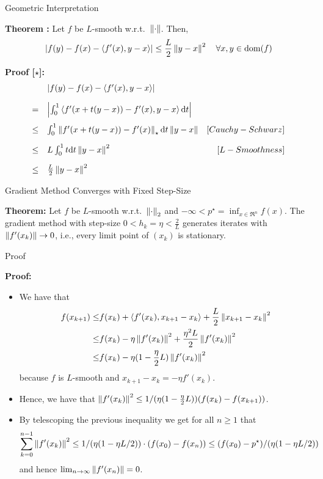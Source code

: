 \documentclass[9pt]{beamer}
\begin{document}
\begin{frame}{Geometric Interpretation}

  \textbf{Theorem :} Let $f$ be $L$-smooth w.r.t.\ $\left\|\cdot\right\|$. Then,
  \[
    \left|f(y)-f(x)-\left<f'(x), y-x\right>\right| \leq \frac{L}{2} \left\|y-x\right\|^2 \quad \forall x, y\in \operatorname{dom}(f)
  \]

  \vfill

  \textbf{Proof [$\star$]: }
  \[
    \begin{array}{rlr}
      & \left|f(y)-f(x)-\left<f'(x), y-x\right>\right| & \\[1em]
      = & \left|\int_{0}^1 \left<f'(x+t(y-x))-f'(x), y-x\right> {\mathrm{d}} t\right| & \\[1em]
      \leq & \int_0^1 \left\|f'(x+t(y-x))-f'(x)\right\|_\star {\mathrm{d}} t \left\|y-x\right\| & [Cauchy-Schwarz]\\[1em]
      \leq & L \int_0^1 t {\mathrm{d}} t \left\|y-x\right\|^2 & [L-Smoothness]\\[1em]
      \leq & \frac{L}{2} \left\|y-x\right\|^2 & 
    \end{array}
  \]
\end{frame}

\begin{frame}{Gradient Method Converges with Fixed Step-Size}

  \textbf{Theorem:} Let $f$ be $L$-smooth w.r.t.\ $\left\|\cdot\right\|_2$ and $-\infty < p^\star = \inf_{x\in\Re^n} f(x)$. The gradient method with step-size $0<h_k = \eta < \frac{2}{L}$ generates iterates with $\left\|f'(x_k)\right\|\to 0$, i.e., every limit point of $(x_k)$ is stationary.

\end{frame}

\begin{frame}{Proof}

  \textbf{Proof:}
  \begin{itemize}
  \item We have that
    \begin{align*}
      f(x_{k+1}) \leq &  f(x_k) + \left<f'(x_k), x_{k+1}-x_k\right> + \frac{L}{2} \left\|x_{k+1}-x_k\right\|^2 \\
      \leq & f(x_k) - \eta \left\|f'(x_k)\right\|^2+\frac{\eta^2 L}{2} \left\|f'(x_k)\right\|^2 \\
      \leq & f(x_k) - \eta (1-\frac{\eta}{2}L)\left\|f'(x_k)\right\|^2
    \end{align*}
    because $f$ is $L$-smooth and $x_{k+1} - x_k = - \eta f'(x_k)$.
  \item<2-> Hence, we have that $\left\|f'(x_k)\right\|^2\leq 1/(\eta (1-\frac{\eta}{2}L)) (f(x_k)-f(x_{k+1}))$.
  \item<3-> By telescoping the previous inequality we get for all $n\geq 1$ that
    \[
      \sum_{k=0}^{n-1} \left\|f'(x_k)\right\|^2 \leq 1/(\eta (1-{\eta L}/{2}))\cdot (f(x_0)-f(x_{n})) \leq (f(x_0)-p^\star)/(\eta (1-{\eta L}/{2})) 
    \]
    and hence $\lim_{n\to\infty} \left\|f'(x_n)\right\|=0$.
  \end{itemize}
  
\end{frame}
\end{document}
